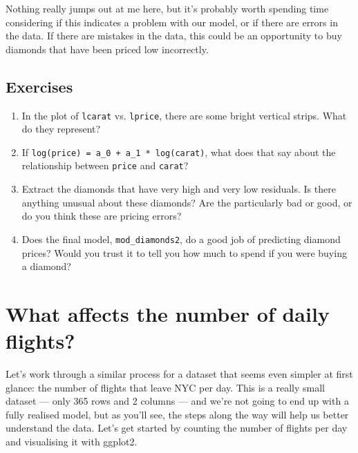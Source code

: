 \documentclass[]{book}
\begin{document}
Nothing really jumps out at me here, but it's probably worth spending
time considering if this indicates a problem with our model, or if there
are errors in the data. If there are mistakes in the data, this could be
an opportunity to buy diamonds that have been priced low incorrectly.

\subsection{Exercises}\label{exercises-63}

\begin{enumerate}
\def\labelenumi{\arabic{enumi}.}
\item
  In the plot of \texttt{lcarat} vs. \texttt{lprice}, there are some
  bright vertical strips. What do they represent?
\item
  If \texttt{log(price)\ =\ a\_0\ +\ a\_1\ *\ log(carat)}, what does
  that say about the relationship between \texttt{price} and
  \texttt{carat}?
\item
  Extract the diamonds that have very high and very low residuals. Is
  there anything unusual about these diamonds? Are the particularly bad
  or good, or do you think these are pricing errors?
\item
  Does the final model, \texttt{mod\_diamonds2}, do a good job of
  predicting diamond prices? Would you trust it to tell you how much to
  spend if you were buying a diamond?
\end{enumerate}

\section{What affects the number of daily
flights?}\label{what-affects-the-number-of-daily-flights}

Let's work through a similar process for a dataset that seems even
simpler at first glance: the number of flights that leave NYC per day.
This is a really small dataset --- only 365 rows and 2 columns --- and
we're not going to end up with a fully realised model, but as you'll
see, the steps along the way will help us better understand the data.
Let's get started by counting the number of flights per day and
visualising it with ggplot2.
\end{document}
